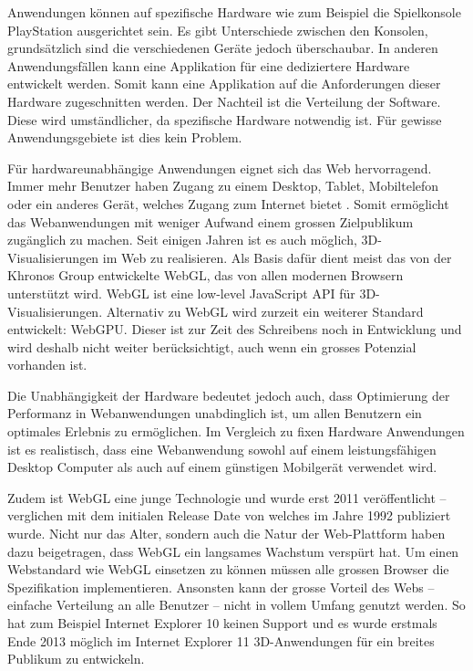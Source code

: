 Anwendungen können auf spezifische Hardware wie zum Beispiel die Spielkonsole PlayStation ausgerichtet sein. Es gibt Unterschiede zwischen den Konsolen, grundsätzlich sind die verschiedenen Geräte jedoch überschaubar. In anderen Anwendungsfällen kann eine Applikation für eine dediziertere Hardware entwickelt werden. Somit kann eine Applikation auf die Anforderungen dieser Hardware zugeschnitten werden. Der Nachteil ist die Verteilung der Software. Diese wird umständlicher, da spezifische Hardware notwendig ist. Für gewisse Anwendungsgebiete ist dies kein Problem.

Für hardwareunabhängige Anwendungen eignet sich das Web hervorragend.
Immer mehr Benutzer haben Zugang zu einem Desktop, Tablet, Mobiltelefon oder ein anderes Gerät, welches Zugang zum Internet bietet \cite{peopleWithInternetAccess}.
Somit ermöglicht das Webanwendungen mit weniger Aufwand einem grossen Zielpublikum zugänglich zu machen.
Seit einigen Jahren ist es auch möglich, 3D-Visualisierungen im Web zu realisieren.
Als Basis dafür dient meist das von der Khronos Group entwickelte WebGL, das von allen modernen Browsern unterstützt wird. WebGL ist eine low-level JavaScript API für 3D-Visualisierungen. \cite{webGl1Spec}
Alternativ zu WebGL wird zurzeit ein weiterer Standard entwickelt: WebGPU. Dieser ist zur Zeit des Schreibens noch in Entwicklung und wird deshalb nicht weiter berücksichtigt, auch wenn ein grosses Potenzial vorhanden ist. \cite{webGPUCharter}

Die Unabhängigkeit der Hardware bedeutet jedoch auch, dass Optimierung der Performanz in Webanwendungen unabdinglich ist, um allen Benutzern ein optimales Erlebnis zu ermöglichen.
Im Vergleich zu fixen Hardware Anwendungen ist es realistisch, dass eine Webanwendung sowohl auf einem leistungsfähigen Desktop Computer als auch auf einem günstigen Mobilgerät verwendet wird.

Zudem ist WebGL eine junge Technologie und wurde erst 2011 veröffentlicht – verglichen mit dem initialen Release Date von  welches im Jahre 1992 publiziert wurde. \cite{webGl1Spec,openGlSpec}
Nicht nur das Alter, sondern auch die Natur der Web-Plattform haben dazu beigetragen, dass WebGL ein langsames Wachstum verspürt hat. Um einen Webstandard wie WebGL einsetzen zu können müssen alle grossen Browser die Spezifikation implementieren. Ansonsten kann der grosse Vorteil des Webs – einfache Verteilung an alle Benutzer – nicht in vollem Umfang genutzt werden. So hat zum Beispiel Internet Explorer 10 keinen Support und es wurde erstmals Ende 2013 möglich im Internet Explorer 11 3D-Anwendungen für ein breites Publikum zu entwickeln.


